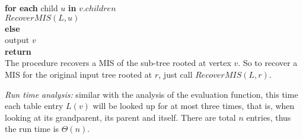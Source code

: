 \documentclass[11pt]{article}
\begin{document}
\begin{enumerate}
  \-\hspace{6em} \textbf{for each} child $u$ \textbf{in} $v.children$ \\ 
  \-\hspace{8em} $RecoverMIS(L, u)$ \\
  \-\hspace{4em} \textbf{else} \\
  \-\hspace{6em} output $v$ \\
  \-\hspace{6em} \textbf{return} \\

  The procedure recovers a MIS of the sub-tree rooted at vertex $v$. So
  to recover a MIS for the original input tree rooted at $r$, just
  call $RecoverMIS(L, r)$. 

  \emph{Run time analysis:} similar with the analysis of the
  evaluation function, this time each table entry $L(v)$ will be
  looked up for at most three times, that is, when looking at its
  grandparent, its parent and itself. There are total $n$ entries,
  thus the run time is $\Theta(n)$.

\end{enumerate}
\end{document}
